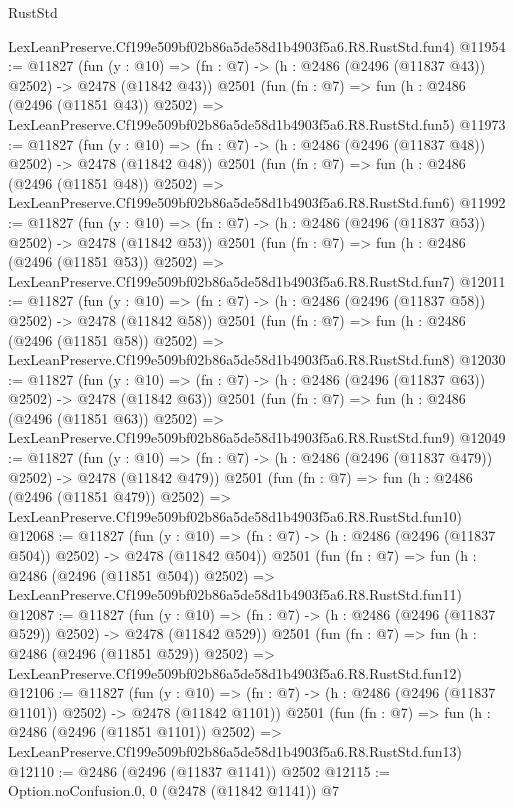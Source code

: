 \begin{lexlean}{RustStd}
\begin{coremodule}
    LexLeanPreserve.Cf199e509bf02b86a5de58d1b4903f5a6.R8.RustStd.fun4)
@11954 := @11827
    (fun (y : @10) => (fn : @7) -> (h : @2486 (@2496 (@11837 @43)) @2502) -> @2478 (@11842 @43))
    @2501
    (fun (fn : @7) =>
    fun (h : @2486 (@2496 (@11851 @43)) @2502) =>
    LexLeanPreserve.Cf199e509bf02b86a5de58d1b4903f5a6.R8.RustStd.fun5)
@11973 := @11827
    (fun (y : @10) => (fn : @7) -> (h : @2486 (@2496 (@11837 @48)) @2502) -> @2478 (@11842 @48))
    @2501
    (fun (fn : @7) =>
    fun (h : @2486 (@2496 (@11851 @48)) @2502) =>
    LexLeanPreserve.Cf199e509bf02b86a5de58d1b4903f5a6.R8.RustStd.fun6)
@11992 := @11827
    (fun (y : @10) => (fn : @7) -> (h : @2486 (@2496 (@11837 @53)) @2502) -> @2478 (@11842 @53))
    @2501
    (fun (fn : @7) =>
    fun (h : @2486 (@2496 (@11851 @53)) @2502) =>
    LexLeanPreserve.Cf199e509bf02b86a5de58d1b4903f5a6.R8.RustStd.fun7)
@12011 := @11827
    (fun (y : @10) => (fn : @7) -> (h : @2486 (@2496 (@11837 @58)) @2502) -> @2478 (@11842 @58))
    @2501
    (fun (fn : @7) =>
    fun (h : @2486 (@2496 (@11851 @58)) @2502) =>
    LexLeanPreserve.Cf199e509bf02b86a5de58d1b4903f5a6.R8.RustStd.fun8)
@12030 := @11827
    (fun (y : @10) => (fn : @7) -> (h : @2486 (@2496 (@11837 @63)) @2502) -> @2478 (@11842 @63))
    @2501
    (fun (fn : @7) =>
    fun (h : @2486 (@2496 (@11851 @63)) @2502) =>
    LexLeanPreserve.Cf199e509bf02b86a5de58d1b4903f5a6.R8.RustStd.fun9)
@12049 := @11827
    (fun (y : @10) => (fn : @7) -> (h : @2486 (@2496 (@11837 @479)) @2502) -> @2478 (@11842 @479))
    @2501
    (fun (fn : @7) =>
    fun (h : @2486 (@2496 (@11851 @479)) @2502) =>
    LexLeanPreserve.Cf199e509bf02b86a5de58d1b4903f5a6.R8.RustStd.fun10)
@12068 := @11827
    (fun (y : @10) => (fn : @7) -> (h : @2486 (@2496 (@11837 @504)) @2502) -> @2478 (@11842 @504))
    @2501
    (fun (fn : @7) =>
    fun (h : @2486 (@2496 (@11851 @504)) @2502) =>
    LexLeanPreserve.Cf199e509bf02b86a5de58d1b4903f5a6.R8.RustStd.fun11)
@12087 := @11827
    (fun (y : @10) => (fn : @7) -> (h : @2486 (@2496 (@11837 @529)) @2502) -> @2478 (@11842 @529))
    @2501
    (fun (fn : @7) =>
    fun (h : @2486 (@2496 (@11851 @529)) @2502) =>
    LexLeanPreserve.Cf199e509bf02b86a5de58d1b4903f5a6.R8.RustStd.fun12)
@12106 := @11827
    (fun (y : @10) => (fn : @7) -> (h : @2486 (@2496 (@11837 @1101)) @2502) -> @2478 (@11842 @1101))
    @2501
    (fun (fn : @7) =>
    fun (h : @2486 (@2496 (@11851 @1101)) @2502) =>
    LexLeanPreserve.Cf199e509bf02b86a5de58d1b4903f5a6.R8.RustStd.fun13)
@12110 := @2486 (@2496 (@11837 @1141)) @2502
@12115 := Option.noConfusion.{0, 0} (@2478 (@11842 @1141)) @7

\end{coremodule}
\end{lexlean}
